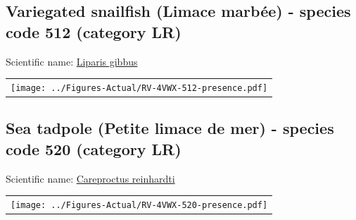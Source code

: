 \documentclass[12pt]{article}\usepackage[]{graphicx}\usepackage[]{color}
\begin{document}
\renewcommand\thefigure{\thesubsection\Alph{figure}}

\setcounter{figure}{0}

\hypertarget{sec:512}{%
\subsection{Variegated snailfish (Limace marbée) - species code 512 (category LR)}\label{sec:512}}

  


Scientific name: \href{http://www.marinespecies.org/aphia.php?p=taxdetails\&id=159526}{Liparis gibbus} \newline
\begin{minipage}{1.0\textwidth}
 \begin{tabular}{c}
\texttt{[image: ../Figures-Actual/RV-4VWX-512-presence.pdf]} \\ 
\end{tabular} 
\end{minipage}
\clearpage

\renewcommand\thefigure{\thesubsection\Alph{figure}}

\setcounter{figure}{0}

\hypertarget{sec:520}{%
\subsection{Sea tadpole (Petite limace de mer) - species code 520 (category LR)}\label{sec:520}}

  


Scientific name: \href{http://www.marinespecies.org/aphia.php?p=taxdetails\&id=127212}{Careproctus reinhardti} \newline
\begin{minipage}{1.0\textwidth}
 \begin{tabular}{c}
\texttt{[image: ../Figures-Actual/RV-4VWX-520-presence.pdf]} \\ 
\end{tabular} 
\end{minipage}
\clearpage

\renewcommand\thefigure{\thesubsection\Alph{figure}}
\end{document}

